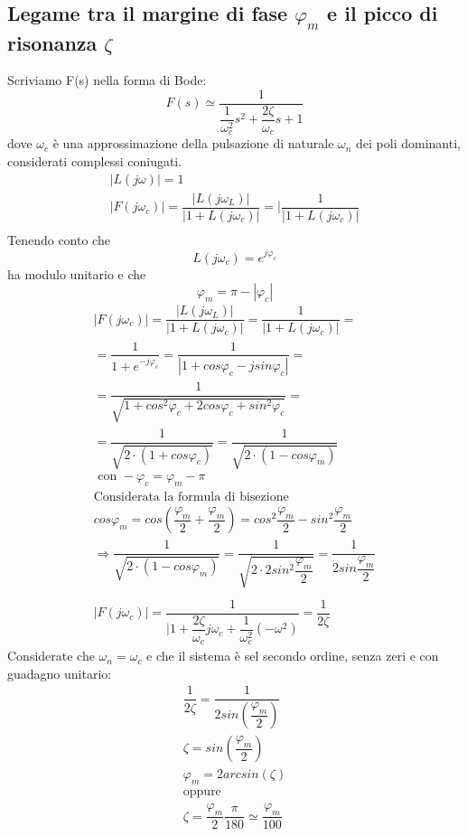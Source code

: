 \documentclass[a4paper]{report}
\begin{document}
\subsection{Legame tra il margine di fase $\varphi_m$ e il picco di
  risonanza $\zeta$} 
Scriviamo F(s) nella forma di Bode:
\[
F(s) \simeq \dfrac{1}{\dfrac{1}{\omega_c^2}s^2 + \dfrac{2
    \zeta}{\omega_c}s + 1}
\]
dove $\omega_c$ \`e una approssimazione della pulsazione di naturale
$\omega_n$ dei poli dominanti, considerati complessi coniugati.
\[
\begin{array}{l}
  |L(j \omega)| = 1\\
  |F(j \omega_c)| = \dfrac{|L(j \omega_L)|}{|1 + L(j \omega_c)|} =
  |\dfrac{1}{|1 + L(j \omega_c)|}\\
\end{array}
\]
Tenendo conto che
\[
L(j \omega_c) = e^{j \varphi_c}
\]
ha modulo unitario e che
\[
\varphi_m = \pi - |\varphi_c|
\]
\[
\begin{array}{l}
  |F(j \omega_c)| = \dfrac{|L(j \omega_L)|}{|1 + L(j \omega_c)|} =
  \dfrac{1}{|1 + L(j \omega_c)|} = \\
  = \dfrac{1}{1 + e^{- j \varphi_c}} = \dfrac{1}{|1 + cos \varphi_c -
    j sin \varphi_c|} =\\
  = \dfrac{1}{\sqrt{1 + cos^2 \varphi_c + 2 cos \varphi_c + sin^2
      \varphi_c}} = \\
  = \dfrac{1}{\sqrt{2 \cdot (1 + cos \varphi_c)}} = \dfrac{1}{\sqrt{2
      \cdot (1 - cos \varphi_m)}}\\
  \textrm{ con } - \varphi_c = \varphi_m - \pi\\
  \textrm{Considerata la formula di bisezione }\\
  cos \varphi_m = cos \left( \dfrac{\varphi_m}{2} +
  \dfrac{\varphi_m}{2} \right) = cos^2 \dfrac{\varphi_m}{2} - sin^2
  \dfrac{\varphi_m}{2}\\ 
  \Rightarrow \dfrac{1}{\sqrt{2 \cdot (1 - cos \varphi_m)}} =
  \dfrac{1}{\sqrt{2 \cdot 2 sin^2 \dfrac{\varphi_m}{2}}} =
  \dfrac{1}{2 sin \dfrac{\varphi_m}{2}}\\
  \\
  |F(j \omega_c)| = \dfrac{1}{|1 + \dfrac{2 \zeta}{\omega_c} j
    \omega_c + \dfrac{1}{\omega_c^2}(- \omega^2)} = \dfrac{1}{2 \zeta}
\end{array}
\]
Considerate che $\omega_n = \omega_c$ e che il sistema \`e sel secondo
ordine, senza zeri e con guadagno unitario:
\begin{equation}
  \begin{array}{l}
    \dfrac{1}{2 \zeta} = \dfrac{1}{2sin \left( \dfrac{\varphi_m}{2} \right)}\\
    \zeta = sin \left( \dfrac{\varphi_m}{2} \right)\\
    \varphi_m = 2 arc sin(\zeta)\\
    \textrm{oppure}\\
    \zeta = \dfrac{\varphi_m}{2} \dfrac{\pi}{180} \simeq
    \dfrac{\varphi_m}{100}
  \end{array}
\end{equation}
\end{document}
